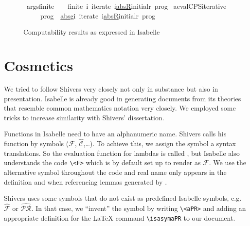 \documentclass[a4paper,parskip=half,BCOR=8mm,DIV=calc,12pt]{scrbook}
\newcommand{\isasymaPR}{\isamath{\widehat{\mathcal{PR}}}}
\newcommand{\F}{\mathcal F}
\newcommand{\aC}{\widehat{\mathcal C}}
\newcommand{\aF}{\widehat{\mathcal F}}
\newcommand{\aPR}{\widehat{\mathcal {PR}}}
\begin{document}
\begin{figure}
\begin{framed}
\begin{isabellebody}%
\isamarkupfalse%
\ args{\isacharunderscore}finite{\isacharcolon}\isanewline\ \ \ \ {\isachardoublequoteopen}finite\ {\isacharparenleft}{\isasymUnion}i{\isachardot}\ iterate\ i{\isasymcdot}{\isacharparenleft}\uline{abs{\isacharunderscore}R}{\isacharparenright}{\isasymcdot}{\isacharbraceleft}initial{\isacharunderscore}r\ prog{\isacharbraceright}{\isacharparenright}{\isachardoublequoteclose}\isanewline
\isanewline
{}\isamarkupfalse%
\ a{\isacharunderscore}evalCPS{\isacharunderscore}iterative{\isacharcolon}\isanewline
\ \ \ \ {\isachardoublequoteopen}{\isasymaPR}\ prog\ {\isacharequal}\ \uline{abs{\isacharunderscore}g}{\isasymcdot}{\isacharparenleft}{\isasymUnion}i{\isachardot}\ iterate\ i{\isasymcdot}{\isacharparenleft}\uline{abs{\isacharunderscore}R}{\isacharparenright}{\isasymcdot}{\isacharbraceleft}initial{\isacharunderscore}r\ prog{\isacharbraceright}{\isacharparenright}{\isachardoublequoteclose}
\end{isabellebody}%
\end{framed}
\caption{Computability results as expressed in Isabelle}
\label{fig:complemmas}
\end{figure}
\section{Cosmetics}
\label{seclayout}

We tried to follow Shivers very closely not only in substance but also in presentation. Isabelle is already good  in generating documents from its theories that resemble common mathematics notation very closely. We employed some tricks to increase similarity with Shivers’ dissertation.

Functions in Isabelle need to have an alphanumeric name. Shivers calls his function by symbols ($\F$, $\aC$,\ldots). To achieve this, we assign the symbol a syntax translations. So the evaluation function for lambdas is called , but Isabelle also understands the code \texttt{\textbackslash<F>} which is by default set up to render as $\F$. We use the alternative symbol throughout the code and real name  only appears in the definition and when referencing lemmas generated by . 

Shivers uses some symbols that do not exist as predefined Isabelle symbols, e.g. $\aF$ or $\aPR$. In that case, we “invent” the symbol by writing \texttt{\textbackslash<aPR>} and adding an appropriate definition for the \LaTeX{} command \texttt{\textbackslash isasymaPR} to our document.
\end{document}
